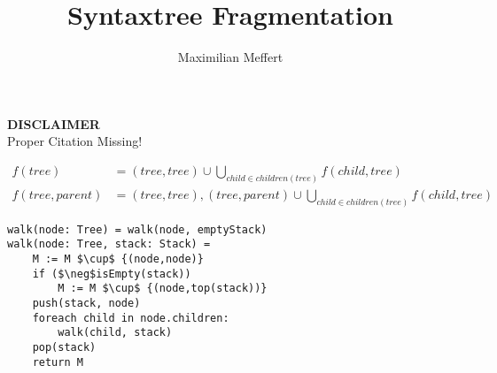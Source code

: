\documentclass[runningheads,a4paper]{llncs}
\title{Syntaxtree Fragmentation}
\author{Maximilian Meffert}
\institute{}
\begin{document}
\maketitle

\begin{center}
\textbf{DISCLAIMER}
\\Proper Citation Missing!
\end{center}

\begin{align*}
f(tree) &= {(tree,tree)} \cup \bigcup_{child \in children(tree)} f(child,tree)
\\
f(tree,parent) &= {(tree,tree), (tree,parent)} \cup \bigcup_{child \in children(tree)} f(child,tree)
\end{align*}

\begin{lstlisting}[language=pseudocode,style=mystyle]
walk(node: Tree) = walk(node, emptyStack)
walk(node: Tree, stack: Stack) =
	M := M $\cup$ {(node,node)}
	if ($\neg$isEmpty(stack)) 
		M := M $\cup$ {(node,top(stack))}
	push(stack, node)
	foreach child in node.children:
		walk(child, stack)	
	pop(stack)
	return M
\end{lstlisting}
\end{document}

